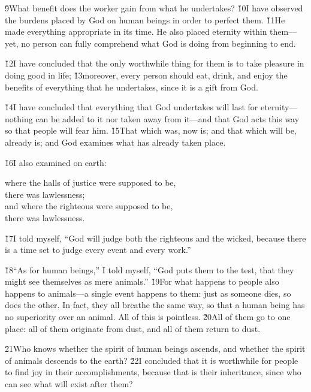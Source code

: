\v{9}What benefit does the worker gain from what he undertakes? \v{10}I have observed the burdens placed by God on human beings in order to perfect them. \v{11}He made everything appropriate in its time. He also placed eternity within them---yet, no person can fully comprehend what God is doing from beginning to end.

\v{12}I have concluded that the only worthwhile thing for them is to take pleasure in doing good in life; \v{13}moreover, every person should eat, drink, and enjoy the benefits of everything that he undertakes, since it is a gift from God.

\v{14}I have concluded that everything that God undertakes will last for eternity---nothing can be added to it nor taken away from it---and that God acts this way so that people will fear him. \v{15}That which was, now is; and that which will be, already is; and God examines what has already taken place.

\v{16}I also examined on earth:

\begin{poetry}
\poeml where the halls of justice were supposed to be, \\
\poemll    there was lawlessness; \\
\poeml and where the righteous were supposed to be, \\
\poemll    there was lawlessness.
\end{poetry}

\v{17}I told myself, ``God will judge both the righteous and the wicked, because there is a time set to judge every event and every work.''

\v{18}``As for human beings,'' I told myself, ``God puts them to the test, that they might see themselves as mere animals.'' \v{19}For what happens to people also happens to animals---a single event happens to them: just as someone dies, so does the other. In fact, they all breathe the same way, so that a human being has no superiority over an animal. All of this is pointless. \v{20}All of them go to one place: all of them originate from dust, and all of them return to dust.

\v{21}Who knows whether the spirit of human beings ascends, and whether the spirit of animals descends to the earth? \v{22}I concluded that it is worthwhile for people to find joy in their accomplishments, because that is their inheritance, since who can see what will exist after them?

